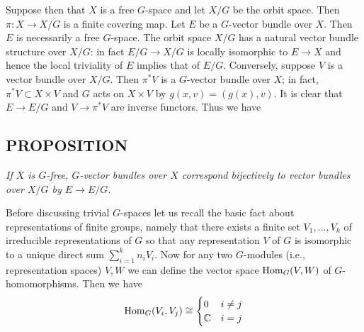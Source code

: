 Suppose then that $X$ is a free $G$-space and let $X/G$ be the orbit space. Then $\pi: X \to X/G$ is a finite covering map. Let $E$ be a $G$-vector bundle over $X$. Then $E$ is necessarily a free $G$-space. The orbit space $X/G$ has a natural vector bundle structure over $X/G$: in fact $E/G \to X/G$ is locally isomorphic to $E \to X$ and hence the local triviality of $E$ implies that of $E/G$. Conversely, suppose $V$ is a vector bundle over $X/G$. Then $\pi^*V$ is a $G$-vector bundle over $X$; in fact, $\pi^*V \subset X \times V$ and $G$ acts on $X \times V$ by $g(x, v) = (g(x), v)$. It is clear that $E \to E/G$ and $V \to \pi^*V$ are inverse functors. Thus we have

\subsection{PROPOSITION}\label{prop:1.6.1} \textit{If $X$ is $G$-free, $G$-vector bundles over $X$ correspond bijectively to vector bundles over $X/G$ by $E \to E/G$.} \par 

Before discussing trivial $G$-spaces let us recall the basic fact about representations of finite groups, namely that there exists a finite set $V_1, \ldots, V_k$ of irreducible representations of $G$ so that any representation $V$ of $G$ is isomorphic to a unique direct sum $\sum_{i=1}^k n_i V_i$. Now for any two $G$-modules (i.e., representation spaces) $V, W$ we can define the vector space $\operatorname{Hom}_G(V, W)$ of $G$-homomorphisms. Then we have
\begin{equation*}
\operatorname{Hom}_G(V_i, V_j) \cong
    \begin{cases}
        0          & i \neq j \\
        \mathbb{C} & i = j
    \end{cases}
\end{equation*}

